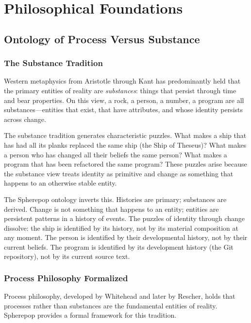 \documentclass[12pt, a4paper, openany]{book}
\theoremstyle{plain}
\theoremstyle{definition}
\theoremstyle{remark}
\begin{document}
\part{Philosophical Foundations}

\chapter{Ontology of Process Versus Substance}

\section{The Substance Tradition}

Western metaphysics from Aristotle through Kant has predominantly held that
the primary entities of reality are \emph{substances}: things that persist
through time and bear properties. On this view, a rock, a person, a number,
a program are all substances---entities that exist, that have attributes, and
whose identity persists across change.

The substance tradition generates characteristic puzzles. What makes a ship
that has had all its planks replaced the same ship (the Ship of Theseus)?
What makes a person who has changed all their beliefs the same person? What
makes a program that has been refactored the same program? These puzzles arise
because the substance view treats identity as primitive and change as something
that happens to an otherwise stable entity.

The Spherepop ontology inverts this. Histories are primary; substances are
derived. Change is not something that happens to an entity; entities are
persistent patterns in a history of events. The puzzles of identity through
change dissolve: the ship is identified by its history, not by its material
composition at any moment. The person is identified by their developmental
history, not by their current beliefs. The program is identified by its
development history (the Git repository), not by its current source text.

\section{Process Philosophy Formalized}

Process philosophy, developed by Whitehead and later by Rescher, holds that
processes rather than substances are the fundamental entities of reality.
Spherepop provides a formal framework for this tradition.
\end{document}
